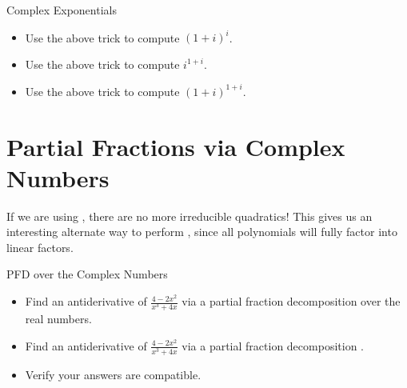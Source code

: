 \begin{exercise}{Complex Exponentials \Coffeecup \Coffeecup}
\begin{itemize}
\item Use the above trick to compute $(1+i)^i$.
\vspace*{1in}
\item Use the above trick to compute $i^{1+i}$.
\vspace*{1in}
\item Use the above trick to compute $(1+i)^{1+i}$.
\vspace*{1in}
\end{itemize}
\end{exercise}

\section{Partial Fractions via Complex Numbers}
If we are using , there are no more irreducible quadratics!  This gives us an interesting alternate way to perform , since all polynomials will fully factor into linear factors.
\begin{exercise}{PFD over the Complex Numbers \Coffeecup \Coffeecup \Coffeecup}

\begin{itemize}
\item Find an antiderivative of $\frac{4-2 x^2}{x^3+4 x}$ via a partial fraction decomposition over the real numbers.
\vspace*{3in}

\item Find an antiderivative of $\frac{4-2 x^2}{x^3+4 x}$ via a partial fraction decomposition .

\vspace*{3in}

\item Verify your answers are compatible.

\vspace*{1in}

\end{itemize}
\end{exercise}


